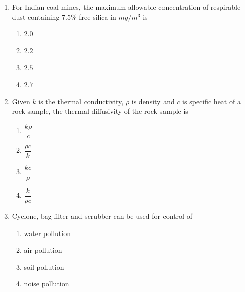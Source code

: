 \documentclass[journal,12pt,onecolumn]{IEEEtran}
\theoremstyle{remark}
\begin{document}
\begin{enumerate}
\hfill{}
\begin{multicols}{4}
\begin{enumerate}
\item $-1$
\item $0$
\item $1$
\item non-existent
\end{enumerate}
\end{multicols}
\item For Indian coal mines, the maximum allowable concentration of respirable dust containing 7.5\% free silica in $mg/m^3$ is

\hfill{}
\begin{multicols}{4}
\begin{enumerate}
\item $2.0$
\item $2.2$
\item $2.5$
\item $2.7$
\end{enumerate}
\end{multicols}
\item  Given $k$ is the thermal conductivity, $\rho$ is density and $c$ is specific heat of a rock sample, the thermal diffusivity of the rock sample is

\hfill{}
\begin{multicols}{4}
\begin{enumerate}
\item $\dfrac{k\rho}{c}$
\item $\dfrac{\rho c}{k}$
\item $\dfrac{kc}{\rho}$
\item $\dfrac{k}{\rho c}$
\end{enumerate}
\end{multicols}

\item Cyclone, bag filter and scrubber can be used for control of

\hfill{}
\begin{multicols}{4}
\begin{enumerate}
\item water pollution
\item air pollution
\item soil pollution
\item noise pollution
\end{enumerate}
\end{multicols}


\end{enumerate}
\end{document}

